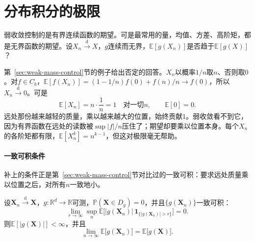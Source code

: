 \section{分布积分的极限}
\label{sec:weak-integral-limits}

弱收敛控制的是有界连续函数的期望。可是最常用的量，均值、方差、高阶矩，都是无界函数的期望。设$X_n\xrightarrow{\mathrm{d}}X$，$g$连续而无界，$\mathbb{E}[g(X_n)]$是否趋于$\mathbb{E}[g(X)]$？

第~\ref{sec:weak-mass-control}节的例子给出否定的回答。$X_n$以概率$1/n$取$n$、否则取$0$。对$f\in C_b$，$\mathbb{E}[f(X_n)]=(1-1/n)f(0)+f(n)/n\to f(0)$，所以$X_n\xrightarrow{\mathrm{d}}0$。可是
\[
 \mathbb{E}[X_n]=n\cdot\frac1n=1\quad\text{对一切}n,\qquad\mathbb{E}[0]=0 .
\]
远处那份越来越轻的质量，乘以越来越大的位置，始终贡献$1$。弱收敛看不到它，因为有界函数在远处的读数被$\sup\lvert f\rvert/n$压住了；期望却要乘以位置本身。每个$X_n$的各阶矩都有限，$\mathbb{E}[X_n^{k}]=n^{k-1}$，但这对极限毫无帮助。

\paragraph{一致可积条件}
补上的条件正是第~\ref{sec:weak-mass-control}节对比过的一致可积：要求远处质量乘以位置之后，对所有$n$一致地小。

\begin{theorem}[期望的收敛]
\label{thm:weak-ui-expectation}
设$\bm{X}_n\xrightarrow{\mathrm{d}}\bm{X}$，$g:\mathbb{R}^{d}\to\mathbb{R}$可测，$\mathbb{P}(\bm{X}\in D_g)=0$，并且$\{g(\bm{X}_n)\}$一致可积：
\begin{equation}
 \lim_{r\to\infty}\sup_{n}\mathbb{E}\bigl[\lvert g(\bm{X}_n)\rvert\,\mathbf{1}_{\{\lvert g(\bm{X}_n)\rvert>r\}}\bigr]=0 .
 \label{eq:weak-ui}
\end{equation}
则$\mathbb{E}[\lvert g(\bm{X})\rvert]<\infty$，并且
\begin{equation}
 \lim_{n\to\infty}\mathbb{E}\bigl[g(\bm{X}_n)\bigr]=\mathbb{E}\bigl[g(\bm{X})\bigr] .
 \label{eq:weak-ui-expectation}
\end{equation}
\end{theorem}

